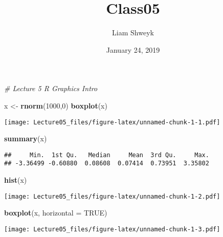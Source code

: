 \documentclass[]{article}
\title{Class05}
\author{Liam Shweyk}
\date{January 24, 2019}
\newenvironment{Shaded}{\begin{snugshade}}{\end{snugshade}}
\newcommand{\KeywordTok}[1]{\textcolor[rgb]{0.13,0.29,0.53}{\textbf{#1}}}
\newcommand{\DataTypeTok}[1]{\textcolor[rgb]{0.13,0.29,0.53}{#1}}
\newcommand{\DecValTok}[1]{\textcolor[rgb]{0.00,0.00,0.81}{#1}}
\newcommand{\FloatTok}[1]{\textcolor[rgb]{0.00,0.00,0.81}{#1}}
\newcommand{\StringTok}[1]{\textcolor[rgb]{0.31,0.60,0.02}{#1}}
\newcommand{\CommentTok}[1]{\textcolor[rgb]{0.56,0.35,0.01}{\textit{#1}}}
\newcommand{\OtherTok}[1]{\textcolor[rgb]{0.56,0.35,0.01}{#1}}
\newcommand{\OperatorTok}[1]{\textcolor[rgb]{0.81,0.36,0.00}{\textbf{#1}}}
\newcommand{\NormalTok}[1]{#1}
\begin{document}
\maketitle

\begin{Shaded}
\begin{Highlighting}[]
\CommentTok{# Lecture 5 R Graphics Intro}

\NormalTok{x <-}\StringTok{ }\KeywordTok{rnorm}\NormalTok{(}\DecValTok{1000}\NormalTok{,}\DecValTok{0}\NormalTok{)}
\KeywordTok{boxplot}\NormalTok{(x)}
\end{Highlighting}
\end{Shaded}

\texttt{[image: Lecture05\_files/figure-latex/unnamed-chunk-1-1.pdf]}

\begin{Shaded}
\begin{Highlighting}[]
\KeywordTok{summary}\NormalTok{(x)}
\end{Highlighting}
\end{Shaded}

\begin{verbatim}
##     Min.  1st Qu.   Median     Mean  3rd Qu.     Max. 
## -3.36499 -0.60880  0.08608  0.07414  0.73951  3.35802
\end{verbatim}

\begin{Shaded}
\begin{Highlighting}[]
\KeywordTok{hist}\NormalTok{(x)}
\end{Highlighting}
\end{Shaded}

\texttt{[image: Lecture05\_files/figure-latex/unnamed-chunk-1-2.pdf]}

\begin{Shaded}
\begin{Highlighting}[]
\KeywordTok{boxplot}\NormalTok{(x, }\DataTypeTok{horizontal =} \OtherTok{TRUE}\NormalTok{)}
\end{Highlighting}
\end{Shaded}

\texttt{[image: Lecture05\_files/figure-latex/unnamed-chunk-1-3.pdf]}

\begin{Shaded}
\end{Shaded}
\end{document}
